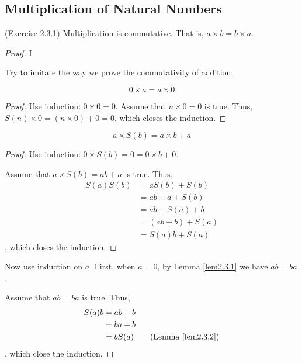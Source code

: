 \subsection{Multiplication of Natural Numbers}
\begin{lem}
(Exercise 2.3.1) \label{exercise2.3.1}
Multiplication is commutative. That is, $a \times b = b \times a$.
\end{lem}
\begin{proof} I

Try to imitate the way we prove the commutativity of addition.

\begin{lem}
\[
0 \times a = a \times 0 \label{lem2.3.1}
\]
\end{lem}
\begin{proof}
Use induction: $0 \times 0 = 0$. Assume that $n \times 0 = 0$ is 
true. Thus, $S(n) \times 0 = (n \times 0) + 0 = 0$, which closes the induction.
\end{proof}

\begin{lem}
\[
a \times S(b) = a \times b + a \label{lem2.3.2}
\]
\end{lem}
\begin{proof}
Use induction: $0 \times S(b) = 0 = 0 \times b + 0$.

Assume that $a \times S(b) = ab + a$ is true. Thus, 
\begin{align*}
S(a)S(b) 
&= aS(b) + S(b) \tag{By Def.}\\
&= ab + a + S(b) \tag{By assumption}\\
&= ab+S(a)+b \tag{By addition's properties}\\
&= (ab+b)+S(a) \tag{By addition's properties}\\
&= S(a)b + S(a) \tag{By Def.}
\end{align*}, which closes the induction.
\end{proof}

Now use induction on $a$. First, when $a=0$, by Lemma \ref{lem2.3.1} we have $ab=ba$. 

Assume that $ab=ba$ is true. Thus,
\begin{align*}
S(a)b
&=ab+b \\
&=ba+b  \\
&=bS(a) \tag{Lemma \ref{lem2.3.2}}
\end{align*}, which close the induction.

\end{proof}


